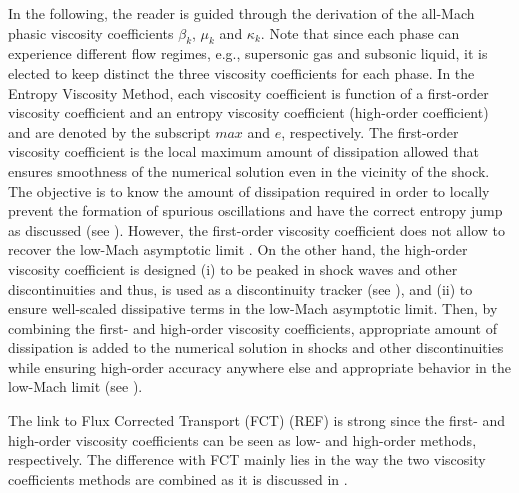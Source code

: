\documentclass[preprint,10pt]{elsarticle}
\begin{document}
In the following, the reader is guided through the derivation of the all-Mach phasic viscosity coefficients $\beta_k$, $\mu_k$ and $\kappa_k$. Note that since each phase can experience different flow regimes, 
e.g., supersonic gas and subsonic liquid, it is elected to keep distinct the three viscosity coefficients for each phase.
In the Entropy Viscosity Method, each viscosity coefficient is function of a first-order 
viscosity coefficient and an entropy viscosity coefficient (high-order coefficient) 
and are denoted by the subscript $max$ and $e$, respectively. The first-order viscosity coefficient is the local maximum amount of dissipation allowed that ensures smoothness of the numerical solution even in the vicinity of the shock. The objective is to know the amount of dissipation required in order to locally prevent the formation of spurious oscillations and have the correct entropy jump as discussed (see ). However, the first-order viscosity coefficient does not allow to recover the low-Mach asymptotic limit \cite{Marco_paper_sem}. On the other hand, the high-order viscosity coefficient is designed (i) to be peaked in shock waves and other discontinuities and thus, is used as a discontinuity tracker (see ), and (ii) to ensure well-scaled dissipative terms in the low-Mach asymptotic limit. Then, by combining the first- and high-order viscosity coefficients, appropriate amount of dissipation is added to the numerical solution in shocks and other discontinuities while ensuring high-order accuracy anywhere else and appropriate behavior in the low-Mach limit (see ).
\\  
%
\begin{remark}
The link to Flux Corrected Transport (FCT) (REF) is strong since the first- and high-order viscosity coefficients can be seen as low- and high-order methods, respectively. The difference with FCT mainly lies in the way the two viscosity coefficients methods are combined as it is discussed in .
\end{remark}
%
\end{document}
